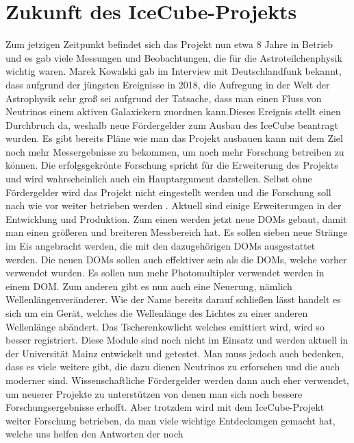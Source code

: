     \section{Zukunft des IceCube-Projekts}

    Zum jetzigen Zeitpunkt befindet sich das Projekt nun etwa 8 Jahre in Betrieb und es gab viele 
    Messungen und Beobachtungen, die für die Astroteilchenphysik wichtig waren.  Marek Kowalski gab im 
    Interview mit Deutschlandfunk bekannt, dass aufgrund der jüngsten Ereignisse in 2018, die Aufregung 
    in der Welt der Astrophysik sehr groß sei aufgrund der Tatsache, dass man einen  Fluss von Neutrinos 
    einem aktiven Galaxiekern zuordnen kann.Dieses Ereignis stellt einen Durchbruch da, weshalb neue 
    Fördergelder zum Ausbau des IceCube beantragt wurden.
    Es gibt bereits Pläne wie man das Projekt ausbauen kann mit dem Ziel noch mehr Messergebnisse zu bekommen, 
    um noch mehr Forschung betreiben zu können. Die erfolgsgekrönte Forschung spricht für die Erweiterung des 
    Projekts und wird wahrscheinlich auch ein Hauptargument darstellen. Selbst ohne Fördergelder wird das 
    Projekt nicht eingestellt werden und die Forschung soll nach wie vor weiter betrieben werden \cite{DeFuInt18}.   
    Aktuell sind einige Erweiterungen in der Entwicklung und Produktion. 
    Zum einen werden jetzt neue DOMs gebaut, damit man einen größeren und breiteren Messbereich hat. 
    Es sollen sieben neue Stränge im Eis angebracht werden, die mit den dazugehörigen DOMs ausgestattet 
    werden. Die neuen DOMs sollen auch effektiver sein als die DOMs, welche vorher verwendet wurden. Es 
    sollen nun mehr Photomultipler verwendet werden in einem DOM. Zum anderen gibt es nun auch eine Neuerung, 
    nämlich \grqq Wellenlängenveränderer\grqq{}. Wie der Name bereits darauf schließen lässt handelt es sich um ein 
    Gerät, welches die Wellenlänge des Lichtes zu einer anderen Wellenlänge abändert. Das Tscherenkowlicht 
    welches emittiert wird, wird so besser registriert. Diese Module sind noch nicht im Einsatz und werden 
    aktuell in der Universität Mainz entwickelt und getestet. Man muss jedoch auch bedenken, dass es viele 
    weitere gibt, die dazu dienen Neutrinos zu erforschen und die auch moderner sind. Wissenschaftliche 
    Fördergelder werden dann auch eher verwendet, um  neuerer Projekte zu unterstützen von denen man sich 
    noch bessere Forschungsergebnisse erhofft. Aber trotzdem wird mit dem IceCube-Projekt weiter Forschung 
    betrieben, da man viele wichtige Entdeckungen gemacht hat, welche uns helfen den Antworten der noch 
